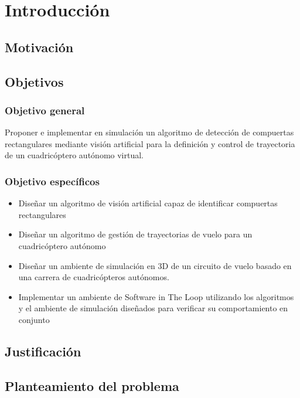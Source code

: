 \chapter{Introducción}

\section{Motivación}



\section{Objetivos}
\subsection{Objetivo general}

Proponer e implementar en simulación un algoritmo de detección de compuertas rectangulares mediante visión artificial para la definición y control de trayectoria de un cuadricóptero autónomo virtual.   

\subsection{Objetivo específicos}

\begin{itemize}
    \item Diseñar un algoritmo de visión artificial capaz de identificar compuertas rectangulares 
    \item Diseñar un algoritmo de gestión de trayectorias de vuelo para un cuadricóptero autónomo 
    \item Diseñar un ambiente de simulación en 3D de un circuito de vuelo basado en una carrera de cuadricópteros autónomos. 
    \item Implementar un ambiente de Software in The Loop utilizando los algoritmos y el ambiente de simulación diseñados para verificar su comportamiento en conjunto 
\end{itemize}



\section{Justificación}


\section{Planteamiento del problema}


